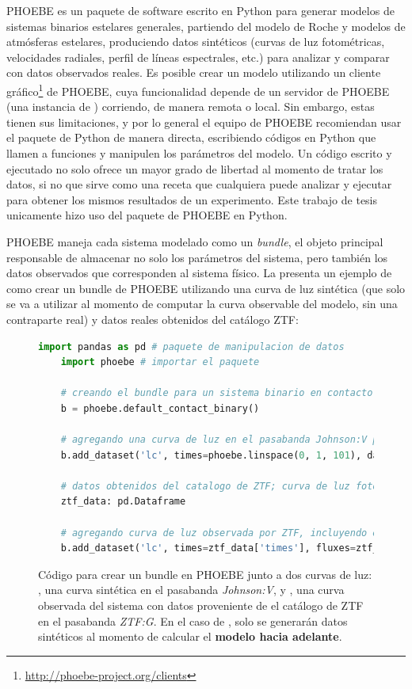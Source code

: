 PHOEBE es un paquete de software escrito en Python para generar modelos de
sistemas binarios estelares generales, partiendo del modelo de Roche y modelos
de atmósferas estelares, produciendo datos sintéticos (curvas de luz
fotométricas, velocidades radiales, perfil de líneas espectrales, etc.) para
analizar y comparar con datos observados reales. Es posible crear un modelo
utilizando un cliente
gráfico\footnote{\protect\url{http://phoebe-project.org/clients}} de PHOEBE,
cuya funcionalidad depende de un servidor de PHOEBE (una instancia de
) corriendo, de manera remota o local. Sin embargo, estas
tienen sus limitaciones, y por lo general el equipo de PHOEBE recomiendan usar
el paquete de Python de manera directa, escribiendo códigos en Python que llamen
a funciones y manipulen los parámetros del modelo. Un código escrito y ejecutado no
solo ofrece un mayor grado de libertad al momento de tratar los datos, si no que
sirve como una receta que cualquiera puede analizar y ejecutar para obtener los
mismos resultados de un experimento. Este trabajo de tesis unicamente hizo uso
del paquete de PHOEBE en Python.

PHOEBE maneja cada sistema modelado como un \textit{bundle}, el objeto principal
responsable de almacenar no solo los parámetros del sistema, pero también los
datos observados que corresponden al sistema físico. La
 presenta un ejemplo de como crear un
bundle de PHOEBE utilizando una curva de luz sintética (que solo se va a
utilizar al momento de computar la curva observable del modelo, sin una
contraparte real) y datos reales obtenidos del catálogo ZTF:

\begin{figure}[!ht]
	\begin{lstlisting}[language=Python, autogobble]
	import pandas as pd # paquete de manipulacion de datos
	import phoebe # importar el paquete

	# creando el bundle para un sistema binario en contacto
	b = phoebe.default_contact_binary() 

	# agregando una curva de luz en el pasabanda Johnson:V para computar (no datos reales)
	b.add_dataset('lc', times=phoebe.linspace(0, 1, 101), dataset='lc01', passband='Johnson:V')

	# datos obtenidos del catalogo de ZTF; curva de luz fotometrica, en el pasabanda ZTF:g
	ztf_data: pd.Dataframe

	# agregando curva de luz observada por ZTF, incluyendo el flujo medido y su incertidumbre
	b.add_dataset('lc', times=ztf_data['times'], fluxes=ztf_data['fluxes'], sigmas=ztf_data['flux_err'], passband='ZTF:g', dataset='lcZtfG')
	\end{lstlisting}
	\caption{Código para crear un bundle en PHOEBE junto a dos curvas de luz:
	, una curva sintética en el pasabanda \textit{Johnson:V}, y
	, una curva observada del sistema con datos proveniente de el
	catálogo de ZTF en el pasabanda \textit{ZTF:G}. En el caso de ,
	solo se generarán datos sintéticos al momento de calcular el \textbf{modelo
	hacia adelante}.}
	\label{codigoCreandoPhoebeBundle}
\end{figure}

